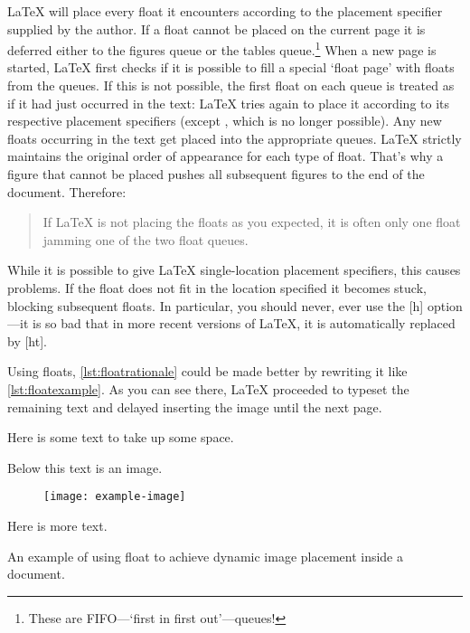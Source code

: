 \LaTeX{} will place every float it encounters according to the placement
specifier supplied by the author. If a float cannot be placed on the current
page it is deferred either to the figures queue or the tables
queue.\footnote{These are FIFO---`first in first out'---queues!}  When a new
page is started, \LaTeX{} first checks if it is possible to fill a special
\enquote*{float page} with floats from the queues. If this is not possible, the
first float on each queue is treated as if it had just occurred in the text:
\LaTeX{} tries again to place it according to its respective placement
specifiers (except , which is no longer possible).  Any new floats
occurring in the text get placed into the appropriate queues. \LaTeX{} strictly
maintains the original order of appearance for each type of float. That's why a
figure that cannot be placed pushes all subsequent figures to the end of the
document. Therefore:
\begin{quote}
  If \LaTeX{} is not placing the floats as you expected,
  it is often only one float jamming one of the two float queues.
\end{quote}

While it is possible to give \LaTeX{}  single-location placement specifiers,
this causes problems.  If the float does not fit in the location specified it
becomes stuck, blocking subsequent floats. In particular, you should never,
ever use the [h] option---it is so bad that in more recent versions of \LaTeX,
it is automatically replaced by [ht].

Using floats, \autoref{lst:floatrationale} could be made better by
rewriting it like \autoref{lst:floatexample}. As you can see there,
\LaTeX{} proceeded to typeset the remaining text and delayed inserting the image
until the next page.
\begin{listing}
  \begin{lined}{11cm}
    \begin{example}[standalone, paperheight=4cm, to_page=2, vertical_pages]
\usepackage{graphicx} %
\geometry{includefoot} %
Here is some text
to take up some space.

Below this text is an image.

\begin{figure}
  \centering
  \texttt{[image: example-image]}
\end{figure}

Here is more text.
\end{example}
  \end{lined}
  \caption{An example of using  float to achieve dynamic image
    placement inside a document.}\label{lst:floatexample}
\end{listing}

